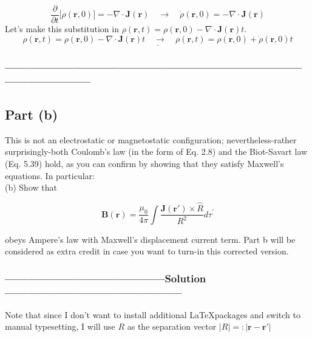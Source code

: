\documentclass[a4paper,12pt]{article} %
\begin{document}
$$ \frac{\partial}{\partial t}\Big[\rho(\mathbf{r}, 0)\Big]=-\nabla \cdot \mathbf{J}(\mathbf{r}) \quad\rightarrow\quad \dot{\rho}(\mathbf{r}, 0)=-\nabla \cdot \mathbf{J}(\mathbf{r})  $$
Let's make this substitution in $\rho(\mathbf{r}, t)=\rho(\mathbf{r}, 0)-\nabla \cdot \mathbf{J}(\mathbf{r}) t$.
$$\underline{\boxed{\rho(\mathbf{r}, t)=\rho(\mathbf{r}, 0)-\nabla \cdot \mathbf{J}(\mathbf{r}) t \quad\rightarrow\quad \rho(\mathbf{r}, t)=\rho(\mathbf{r}, 0)+\dot{\rho}(\mathbf{r}, 0) t}} $$




\subsubsection*{-----------------------------------------------------------------------------------------------------}
\subsection*{Part (b)}
This is not an electrostatic or magnetostatic configuration; nevertheless-rather surprisingly-both Coulomb's law (in the form of Eq. 2.8) and the Biot-Savart law (Eq. 5.39) hold, as you can confirm by showing that they satisfy Maxwell's equations. In particular:\\

(b) Show that

$$
\mathbf{B}(\mathbf{r})=\frac{\mu_0}{4 \pi} \int \frac{\mathbf{J}\left(\mathbf{r}'\right) \times \hat{R}}{R^2} d \tau^{\prime}
$$

obeys Ampere's law with Maxwell's displacement current term.
Part b will be considered as extra credit in case you want to turn-in this corrected version.

\subsubsection*{------------------------------------------Solution-----------------------------------------------}
Note that since I don't want to install additional \LaTeX  packages and switch to manual typesetting, I will use $R$ as the separation vector $|R| =: |\mathbf{r} - \mathbf{r}'| $\\
\end{document}
